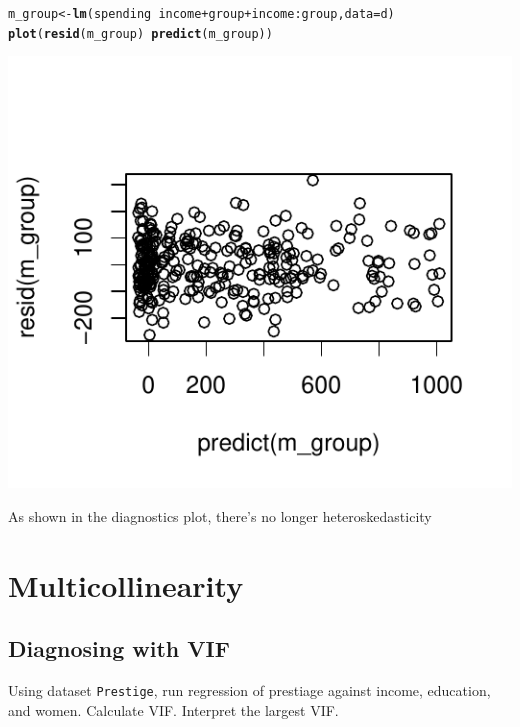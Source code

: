 \documentclass{article}\usepackage[]{graphicx}\usepackage[]{color}
\makeatletter
\def\maxwidth{ %
  \ifdim\Gin@nat@width>\linewidth
    \linewidth
  \else
    \Gin@nat@width
  \fi
}
\newcommand{\hlopt}[1]{\textcolor[rgb]{0,0,0}{#1}}%
\newcommand{\hlstd}[1]{\textcolor[rgb]{0.345,0.345,0.345}{#1}}%
\newcommand{\hlkwb}[1]{\textcolor[rgb]{0.69,0.353,0.396}{#1}}%
\newcommand{\hlkwc}[1]{\textcolor[rgb]{0.333,0.667,0.333}{#1}}%
\newcommand{\hlkwd}[1]{\textcolor[rgb]{0.737,0.353,0.396}{\textbf{#1}}}%
\newenvironment{kframe}{%
 \def\at@end@of@kframe{}%
 \ifinner\ifhmode%
  \def\at@end@of@kframe{\end{minipage}}%
  \begin{minipage}{\columnwidth}%
 \fi\fi%
 \def\FrameCommand##1{\hskip\@totalleftmargin \hskip-\fboxsep
 \colorbox{shadecolor}{##1}\hskip-\fboxsep
     \hskip-\linewidth \hskip-\@totalleftmargin \hskip\columnwidth}%
 \MakeFramed {\advance\hsize-\width
   \@totalleftmargin\z@ \linewidth\hsize
   \@setminipage}}%
 {\par\unskip\endMakeFramed%
 \at@end@of@kframe}
\newenvironment{knitrout}{}{} %
\makeatother
\begin{document}
\begin{knitrout}
\color{fgcolor}\begin{kframe}
\begin{alltt}
\hlstd{m_group} \hlkwb{<-} \hlkwd{lm}\hlstd{(spending} \hlopt{~} \hlstd{income} \hlopt{+} \hlstd{group} \hlopt{+} \hlstd{income}\hlopt{:}\hlstd{group,} \hlkwc{data} \hlstd{= d)}
\hlkwd{plot}\hlstd{(}\hlkwd{resid}\hlstd{(m_group)} \hlopt{~} \hlkwd{predict}\hlstd{(m_group))}
\end{alltt}
\end{kframe}
\includegraphics[width=\maxwidth]{figure/unnamed-chunk-8-1} 

\end{knitrout}

As shown in the diagnostics plot, there's no longer heteroskedasticity

\section{Multicollinearity}

\subsection{Diagnosing with VIF}

Using dataset \verb`Prestige`, run regression of prestiage against income, education, and women. Calculate VIF. Interpret the largest VIF.
\end{document}
